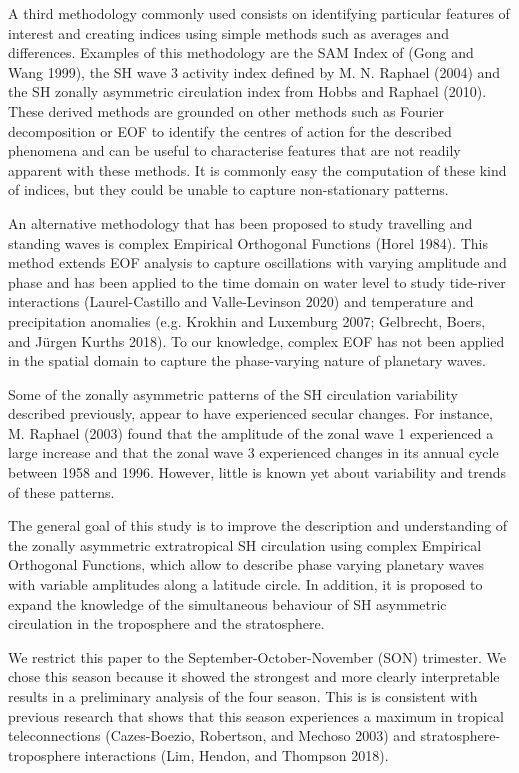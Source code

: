 \documentclass[smallextended]{svjour3}       %
\begin{document}
A third methodology commonly used consists on identifying particular features of interest and creating indices using simple methods such as averages and differences.
Examples of this methodology are the SAM Index of (Gong and Wang 1999), the SH wave 3 activity index defined by M. N. Raphael (2004) and the SH zonally asymmetric circulation index from Hobbs and Raphael (2010).
These derived methods are grounded on other methods such as Fourier decomposition or EOF to identify the centres of action for the described phenomena and can be useful to characterise features that are not readily apparent with these methods.
It is commonly easy the computation of these kind of indices, but they could be unable to capture non-stationary patterns.

An alternative methodology that has been proposed to study travelling and standing waves is complex Empirical Orthogonal Functions (Horel 1984).
This method extends EOF analysis to capture oscillations with varying amplitude and phase and has been applied to the time domain on water level to study tide-river interactions (Laurel-Castillo and Valle-Levinson 2020) and temperature and precipitation anomalies (e.g. Krokhin and Luxemburg 2007; Gelbrecht, Boers, and Jürgen Kurths 2018).
To our knowledge, complex EOF has not been applied in the spatial domain to capture the phase-varying nature of planetary waves.

Some of the zonally asymmetric patterns of the SH circulation variability described previously, appear to have experienced secular changes.
For instance, M. Raphael (2003) found that the amplitude of the zonal wave 1 experienced a large increase and that the zonal wave 3 experienced changes in its annual cycle between 1958 and 1996.
However, little is known yet about variability and trends of these patterns.

The general goal of this study is to improve the description and understanding of the zonally asymmetric extratropical SH circulation using complex Empirical Orthogonal Functions, which allow to describe phase varying planetary waves with variable amplitudes along a latitude circle.
In addition, it is proposed to expand the knowledge of the simultaneous behaviour of SH asymmetric circulation in the troposphere and the stratosphere.

We restrict this paper to the September-October-November (SON) trimester.
We chose this season because it showed the strongest and more clearly interpretable results in a preliminary analysis of the four season.
This is is consistent with previous research that shows that this season experiences a maximum in tropical teleconnections (Cazes-Boezio, Robertson, and Mechoso 2003) and stratosphere-troposphere interactions (Lim, Hendon, and Thompson 2018).
\end{document}
